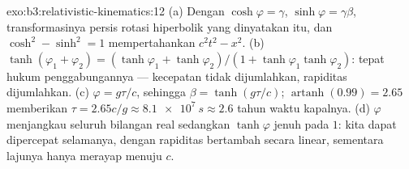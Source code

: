 \begin{solution}{exo:b3:relativistic-kinematics:12}
(a) Dengan $\cosh\varphi = \gamma$, $\sinh\varphi = \gamma\beta$,
transformasinya persis rotasi hiperbolik yang dinyatakan itu, dan
$\cosh^2 - \sinh^2 = 1$ mempertahankan $c^2t^2 - x^2$. (b)
$\tanh(\varphi_1 + \varphi_2) = (\tanh\varphi_1 + \tanh\varphi_2)/(1 +
\tanh\varphi_1\tanh\varphi_2)$: tepat hukum penggabungannya ---
kecepatan tidak dijumlahkan, rapiditas dijumlahkan. (c) $\varphi = g\tau/c$, sehingga
$\beta = \tanh(g\tau/c)$; $\operatorname{artanh}(0.99) = 2.65$ memberikan
$\tau = 2.65c/g \approx \qty{8.1e7}{s} \approx 2.6$ tahun waktu
kapalnya. (d) $\varphi$ menjangkau seluruh bilangan real sedangkan
$\tanh\varphi$ jenuh pada $1$: kita dapat dipercepat selamanya, dengan
rapiditas bertambah secara linear, sementara lajunya hanya merayap
menuju $c$.
\end{solution}

